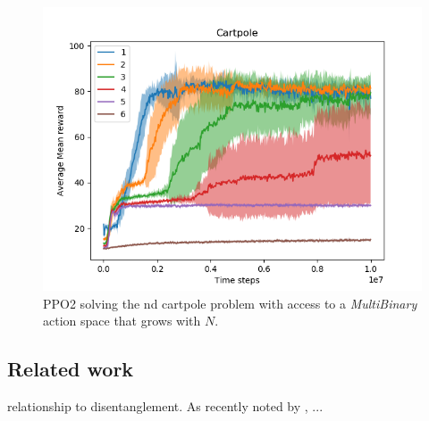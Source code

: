 \begin{figure}
\centering
\includegraphics[width=1\textwidth,height=0.5\textheight]{../../pictures/figures/discrete-nd-cart.png}
\caption{PPO2 solving the nd cartpole problem with access to a \textit{MultiBinary} action space that grows with $N$.}
\end{figure}


\subsection{Related work}

relationship to disentanglement.
As recently noted by \cite{Caselles-Dupre2019}, ...
